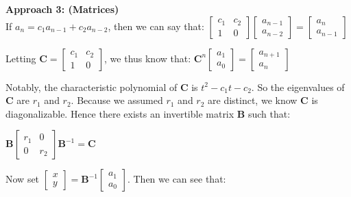 \documentclass{book}
\newcommand{\hTwo}{%
\color{MidnightBlue}%
   \fontsize{13}{15}\selectfont%
}
\newenvironment{myIndent}{%
   \begin{adjustwidth}{2.5em}{0em}%
}{%
   \end{adjustwidth}%
}
\newcommand{\blab}[1]{\textbf{#1}}
\newcommand{\retTwo}{\hfill\bigbreak}
\begin{document}
\begin{myIndent}\hTwo
   \blab{Approach 3: (Matrices)}\\
   If $a_n = c_1a_{n-1} + c_2a_{n-2}$, then we can say that: $\begin{bmatrix}c_1 & c_2 \\ 1 & 0\end{bmatrix}\begin{bmatrix}a_{n-1} \\ a_{n-2}\end{bmatrix} = \begin{bmatrix}a_n \\ a_{n-1}\end{bmatrix}$\retTwo

   Letting $\bm{C} = 
   \begin{bmatrix}
      c_1 & c_2 \\ 1 & 0
   \end{bmatrix}$, we thus know that: $\bm{C}^n \begin{bmatrix}a_1 \\ a_0\end{bmatrix} = \begin{bmatrix}a_{n+1} \\ a_{n}\end{bmatrix}$\retTwo

   Notably, the characteristic polynomial of $\bm{C}$ is $t^2 - c_1t - c_2$. So the eigenvalues of $\bm{C}$ are $r_1$ and $r_2$. Because we assumed $r_1$ and $r_2$ are distinct, we know $\bm{C}$  is\\ diagonalizable. Hence there exists an invertible matrix $\bm{B}$ such that:
   
   {\center$\bm{B}
   \begin{bmatrix}
      r_1 & 0 \\ 0 & r_2
   \end{bmatrix}\bm{B}^{-1} = \bm{C}$\retTwo\par}

   Now set $\begin{bmatrix} x \\ y\end{bmatrix} = \bm{B}^{-1}\begin{bmatrix} a_1 \\ a_0\end{bmatrix}$. Then we can see that:


\end{myIndent}
\end{document}
